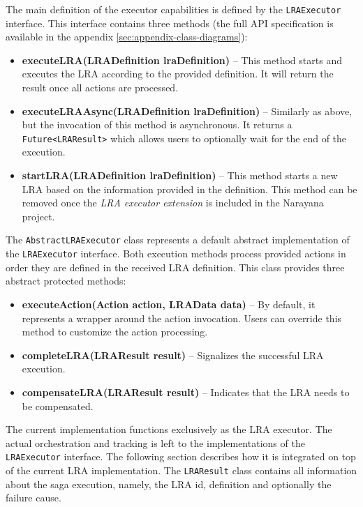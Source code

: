 \documentclass[oneside,
  digital, %
  table,   %
  nolof,     %
  nolot,     %
]{fithesis3}
\begin{document}
The main definition of the executor capabilities is defined by the \texttt{LRAExecutor} interface. This interface contains three methods (the full API specification is available in the appendix \ref{sec:appendix-class-diagrams}):

\begin{itemize}
    \item \textbf{executeLRA(LRADefinition lraDefinition)} -- This method starts and executes the LRA according to the provided definition. It will return the result once all actions are processed.
    
    \item \textbf{executeLRAAsync(LRADefinition lraDefinition)} -- Similarly as above, but the invocation of this method is asynchronous. It returns a \texttt{Future<LRAResult>} which allows users to optionally wait for the end of the execution.
    
    \item \textbf{startLRA(LRADefinition lraDefinition)} -- This method starts a new LRA based on the information provided in the definition. This method can be removed once the \textit{LRA executor extension} is included in the Narayana project.
\end{itemize}

The \texttt{AbstractLRAExecutor} class represents a default abstract implementation of the \texttt{LRAExecutor} interface. Both execution methods process provided actions in order they are defined in the received LRA definition. This class provides three abstract protected methods:

\begin{itemize}
    \item \textbf{executeAction(Action action, LRAData data)} -- By default, it represents a wrapper around the action invocation. Users can override this method to customize the action processing.
    
    \item \textbf{completeLRA(LRAResult result)} -- Signalizes the successful LRA execution.
    
    \item \textbf{compensateLRA(LRAResult result)} -- Indicates that the LRA needs to be compensated.
\end{itemize}

The current implementation functions exclusively as the LRA executor. The actual orchestration and tracking is left to the implementations of the \texttt{LRAExecutor} interface. The following section describes how it is integrated on top of the current LRA implementation. The \texttt{LRAResult} class contains all information about the saga execution, namely, the LRA id, definition and optionally the failure cause.
\end{document}
